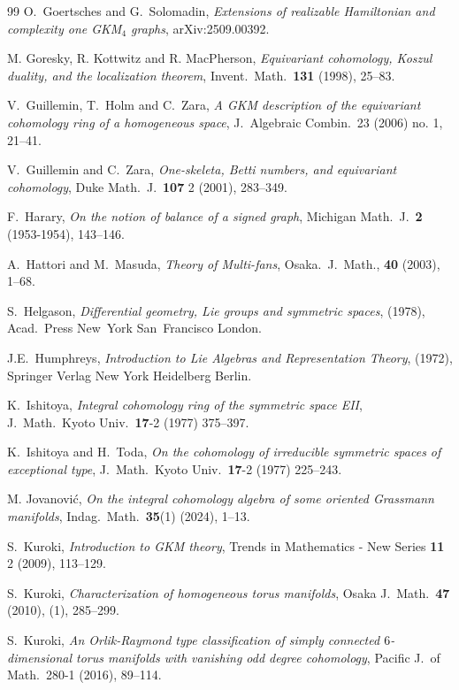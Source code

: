 \documentclass{amsart}
\theoremstyle{definition}
\theoremstyle{remark}
\numberwithin{equation}{section}
\begin{document}
\begin{thebibliography}{99}
 O.~Goertsches and G.~Solomadin, 
\emph{Extensions of realizable Hamiltonian and complexity one GKM$_{4}$ graphs}, arXiv:2509.00392.

 M. Goresky, R. Kottwitz and R. MacPherson, 
\emph{Equivariant cohomology, Koszul duality, and the localization theorem},
Invent.~Math.~\textbf{131} (1998), 25--83.

V.~Guillemin, T.~Holm and C.~Zara, 
\emph{A GKM description of the equivariant cohomology ring of a homogeneous space}, J.~Algebraic Combin.~23 (2006) no. 1, 21--41.

V.~Guillemin and C.~Zara, 
\emph{One-skeleta, Betti numbers, and equivariant cohomology}, 
Duke Math.~J.~\textbf{107} 2 (2001), 283--349.

F.~Harary, 
\emph{On the notion of balance of a signed graph},
Michigan Math.~J.~\textbf{2} (1953-1954), 143--146.

A.~Hattori and M.~Masuda, 
\emph{Theory of Multi-fans}, Osaka.~J.~Math., \textbf{40} (2003), 1--68.

S.~Helgason, 
\emph{Differential geometry, Lie groups and symmetric spaces}, (1978),
Acad.~Press New~York San~Francisco London.

J.E.~Humphreys,
\emph{Introduction to Lie Algebras and Representation Theory}, (1972), Springer Verlag New York Heidelberg Berlin.

K.~Ishitoya,
\emph{Integral cohomology ring of the symmetric space EII},
J.~Math.~Kyoto Univ.~\textbf{17}-2 (1977) 375--397.

K.~Ishitoya and H.~Toda,
\emph{On the cohomology of irreducible symmetric spaces of exceptional type},
J.~Math.~Kyoto Univ.~\textbf{17}-2 (1977) 225--243.

M. Jovanovi\'c, 
\emph{On the integral cohomology algebra of some oriented Grassmann manifolds}, Indag.~Math.~\textbf{35}(1) (2024), 1--13.

S.~Kuroki, 
\emph{Introduction to GKM theory}, 
Trends in Mathematics - New Series \textbf{11} 2 (2009), 113--129.

S.~Kuroki,
\emph{Characterization of homogeneous torus manifolds},
Osaka J.~Math.~\textbf{47} (2010), (1), 285--299.

S.~Kuroki, 
\emph{An Orlik-Raymond type classification of simply connected $6$-dimensional torus manifolds with vanishing odd degree cohomology}, 
Pacific J.~of Math.~280-1 (2016), 89--114.


\end{thebibliography}
\end{document}
